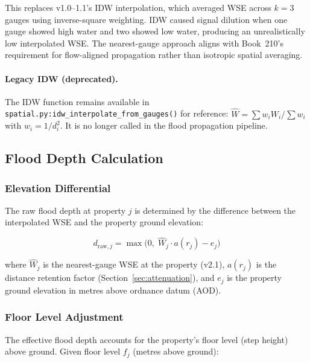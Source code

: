 \documentclass[11pt,a4paper]{article}
\begin{document}
\noindent This replaces v1.0--1.1's IDW interpolation, which averaged WSE across $k = 3$
gauges using inverse-square weighting. IDW caused signal dilution when one gauge showed
high water and two showed low water, producing an unrealistically low interpolated WSE.
The nearest-gauge approach aligns with Book~210's requirement for flow-aligned
propagation rather than isotropic spatial averaging.

\paragraph{Legacy IDW (deprecated).} The IDW function remains available in
\texttt{spatial.py:idw\_interpolate\_from\_gauges()} for reference:
$\hat{W} = \sum w_i W_i / \sum w_i$ with $w_i = 1/d_i^2$. It is no longer called
in the flood propagation pipeline.

\subsection{Flood Depth Calculation}
\label{sec:depth_calc}

\subsubsection{Elevation Differential}

The raw flood depth at property $j$ is determined by the difference between the
interpolated WSE and the property ground elevation:

\begin{equation}
    d_{\text{raw},j} = \max\!\big(0, \; \hat{W}_j \cdot a(r_j) - e_j\big)
    \label{eq:raw_depth}
\end{equation}

\noindent where $\hat{W}_j$ is the nearest-gauge WSE at the property (v2.1),
$a(r_j)$ is the distance retention factor (Section~\ref{sec:attenuation}),
and $e_j$ is the property ground elevation in metres above ordnance datum (AOD).

\subsubsection{Floor Level Adjustment}

The effective flood depth accounts for the property's floor level (step height)
above ground. Given floor level $f_j$ (metres above ground):
\end{document}
